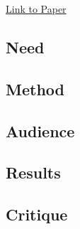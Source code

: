 \documentclass[
	letterpaper, %
]{jdf}
\begin{document}
\href{https://dl.acm.org/doi/pdf/10.1145/3534678.3539081}{Link to Paper}

\subsection{Need}

\subsection{Method}

\subsection{Audience}

\subsection{Results}

\subsection{Critique}

\printbibliography{}
\end{document}
